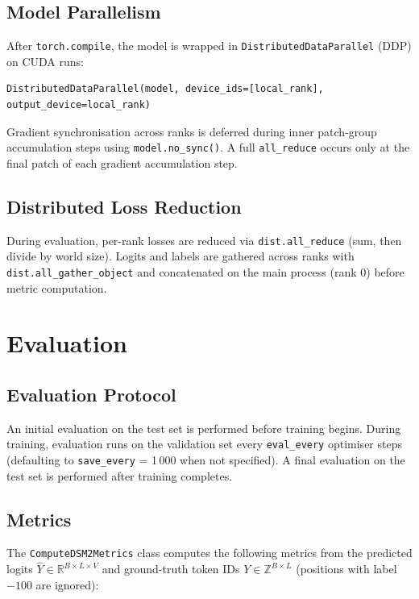 \documentclass[11pt,a4paper]{article}
\begin{document}
\subsection{Model Parallelism}

After \texttt{torch.compile}, the model is wrapped in
\texttt{DistributedDataParallel} (DDP) on CUDA runs:

\begin{verbatim}
DistributedDataParallel(model, device_ids=[local_rank], output_device=local_rank)
\end{verbatim}

Gradient synchronisation across ranks is deferred during inner patch-group accumulation steps using
\texttt{model.no\_sync()}.  A full \texttt{all\_reduce} occurs only at the final patch of each
gradient accumulation step.

\subsection{Distributed Loss Reduction}

During evaluation, per-rank losses are reduced via \texttt{dist.all\_reduce} (sum, then divide by
world size).  Logits and labels are gathered across ranks with
\texttt{dist.all\_gather\_object} and concatenated on the main process (rank 0) before metric
computation.

\section{Evaluation}

\subsection{Evaluation Protocol}

An initial evaluation on the test set is performed before training begins.  During training,
evaluation runs on the validation set every \texttt{eval\_every} optimiser steps (defaulting to
\texttt{save\_every} = 1\,000 when not specified).  A final evaluation on the test set is performed
after training completes.

\subsection{Metrics}

The \texttt{ComputeDSM2Metrics} class computes the following metrics from the predicted logits
$\hat{Y} \in \mathbb{R}^{B \times L \times V}$ and ground-truth token IDs $Y \in \mathbb{Z}^{B
\times L}$ (positions with label $-100$ are ignored):
\end{document}
